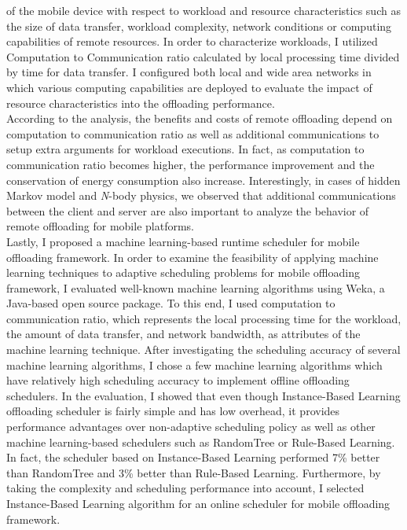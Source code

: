 of the mobile device with respect to workload and resource characteristics
such as the size of data transfer, workload complexity, network
conditions or computing capabilities of remote resources.
%
In order to characterize workloads, I utilized Computation to
Communication ratio calculated by local processing time divided by
time for data transfer.
%
I configured both local and wide area networks in which 
various computing capabilities are deployed to evaluate the impact of
resource characteristics into the offloading performance.\\
%
According to the analysis, the benefits and costs of remote
offloading depend on computation to communication ratio as well as
additional communications to setup extra arguments for workload
executions.
%
In fact, as computation to communication ratio becomes higher, 
the performance improvement and the conservation of energy consumption 
also increase.
%
Interestingly, in cases of hidden Markov model and {\it N}-body
physics, we observed that additional communications between the client
and server are also important to analyze the behavior of remote offloading 
for mobile platforms.\\
%
Lastly, I proposed a machine learning-based runtime scheduler for
mobile offloading framework.
%
In order to examine the feasibility of applying machine learning
techniques to adaptive scheduling problems for mobile offloading
framework, I evaluated well-known machine learning algorithms 
using Weka, a Java-based open source package.
%
To this end, I used computation to communication ratio, which represents
the local processing time for the workload, the amount of data transfer,
and network bandwidth, as attributes of the machine learning
technique.
%
After investigating the scheduling accuracy of several machine learning
algorithms, I chose a few machine learning algorithms which
have relatively high scheduling accuracy to implement offline
offloading schedulers.
%
In the evaluation, I showed that even though Instance-Based Learning 
offloading scheduler is fairly simple and has low overhead, it provides
performance advantages over non-adaptive scheduling policy as well as
other machine learning-based schedulers such as RandomTree
or Rule-Based Learning.
%
In fact, the scheduler based on Instance-Based Learning
performed 7\% better than RandomTree and 3\% better than Rule-Based
Learning.
%
Furthermore, by taking the complexity and scheduling performance into
account, I selected Instance-Based Learning algorithm for an online
scheduler for mobile offloading framework.
